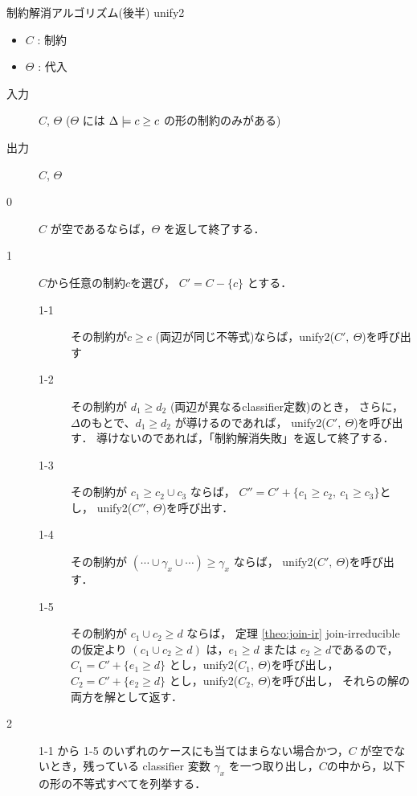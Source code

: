 \begin{oframed}
  制約解消アルゴリズム(後半) unify2
  \begin{itemize}
    \setlength{\itemsep}{-5pt}
  \item $C$ : 制約
  \item $\Theta$ : 代入
  \end{itemize}

  \begin{description}
  \item[入力] $C$, $\Theta$ ($\Theta$ には $\Delta \models {c} \ge {c}$ の形の制約のみがある)
  \item[出力] $C$, $\Theta$
  \end{description}

  \begin{description}
  \item[0] $C$ が空であるならば，$\Theta$ を返して終了する．
  \item[1] $C$から任意の制約$c$を選び， $C' = C - \{c\}$ とする．
    \begin{description}
    \item[1-1] その制約が$c \ge c$ (両辺が同じ不等式)ならば，unify2($C',~ \Theta$)を呼び出す
    \item[1-2] その制約が $d_1 \ge d_2$ (両辺が異なるclassifier定数)のとき，
      さらに，$\Delta$のもとで、$d_1 \ge d_2$ が導けるのであれば，
      unify2($C',~ \Theta$)を呼び出す．
      導けないのであれば，「制約解消失敗」を返して終了する．
    \item[1-3] その制約が $c_1 \ge c_2 \cup c_3$ ならば，
      $C'' = C' + \{c_1 \ge c_2,~ c_1 \ge c_3\}$とし，
      unify2($C'',~ \Theta$)を呼び出す．
    \item[1-4] その制約が $(\cdots \cup \gamma_x \cup \cdots) \ge \gamma_x$ ならば，
      unify2($C',~ \Theta$)を呼び出す．
    \item[1-5] その制約が $c_1 \cup c_2 \ge d$ ならば，
      定理 \ref{theo:join-ir} join-irreducible の仮定より
      $(c_1 \cup c_2 \ge d)$ は，$e_1 \ge d$ または $e_2 \ge d$であるので，
      $C_1 = C' + \{ e_1 \ge d \}$ とし，unify2($C_1,~ \Theta$)を呼び出し，
      $C_2 = C' + \{ e_2 \ge d \}$ とし，unify2($C_2,~ \Theta$)を呼び出し，
      それらの解の両方を解として返す．
    \end{description}
  \item[2] 1-1 から 1-5 のいずれのケースにも当てはまらない場合かつ，$C$ が空でないとき，残っている classifier 変数 $\gamma_x$ を一つ取り出し，$C$の中から，以下の形の不等式すべてを列挙する．
    \begin{align*}

\end{align*}
\end{description}
\end{oframed}
